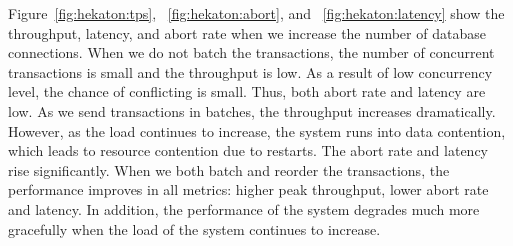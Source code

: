 Figure~\ref{fig:hekaton:tps}, ~\ref{fig:hekaton:abort}, and ~\ref{fig:hekaton:latency} show the throughput, latency, and abort rate when we increase the number of database connections. When we do not batch the transactions, the number of concurrent transactions is small and the throughput is low. As a result of low concurrency level, the chance of conflicting is small. Thus, both abort rate and latency are low. As we send transactions in batches, the throughput increases dramatically. However, as the load continues to increase, the system runs into data contention, which leads to resource contention due to restarts. The abort rate and latency rise significantly. When we both batch and reorder the transactions, the performance improves in all metrics: higher peak throughput, lower abort rate and latency. In addition, the performance of the system degrades much more gracefully when the load of the system continues to increase.
